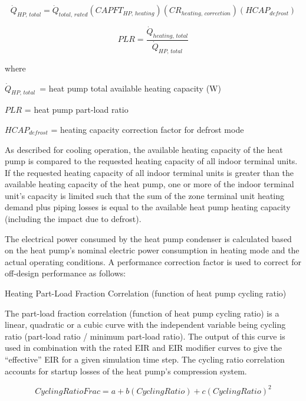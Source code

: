 \begin{equation}
  \dot{Q}_{HP,\,total} = \dot{Q}_{total,\,rated} \left( CAPFT_{HP,\,heating} \right) \left( CR_{heating,\,correction} \right) \left( HCAP_{defrost} \right)
\end{equation}

\begin{equation}
  PLR = \frac{\dot{Q}_{heating,\,total}}{\dot{Q}_{HP,\,total}}
\end{equation}

where

\(\dot{Q}_{HP,\,total}\) = heat pump total available heating capacity (W)

\(PLR\) = heat pump part-load ratio

\(HCAP_{defrost}\) = heating capacity correction factor for defrost mode

As described for cooling operation, the available heating capacity of the heat pump is compared to the requested heating capacity of all indoor terminal units. If the requested heating capacity of all indoor terminal units is greater than the available heating capacity of the heat pump, one or more of the indoor terminal unit's capacity is limited such that the sum of the zone terminal unit heating demand plus piping losses is equal to the available heat pump heating capacity (including the impact due to defrost).

The electrical power consumed by the heat pump condenser is calculated based on the heat pump's nominal electric power consumption in heating mode and the actual operating conditions. A performance correction factor is used to correct for off-design performance as follows:

Heating Part-Load Fraction Correlation (function of heat pump cycling ratio)

The part-load fraction correlation (function of heat pump cycling ratio) is a linear, quadratic or a cubic curve with the independent variable being cycling ratio (part-load ratio / minimum part-load ratio). The output of this curve is used in combination with the rated EIR and EIR modifier curves to give the ``effective'' EIR for a given simulation time step. The cycling ratio correlation accounts for startup losses of the heat pump's compression system.

\begin{equation}
  CyclingRatioFrac = a + b \left( CyclingRatio \right) + c \left( CyclingRatio \right)^2
\end{equation}

